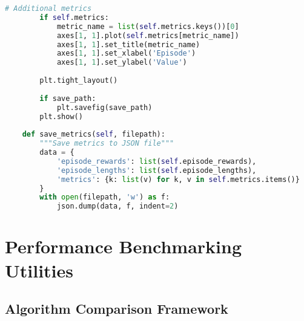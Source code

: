 \begin{lstlisting}[language=Python, caption=Training Logger]
        # Additional metrics
        if self.metrics:
            metric_name = list(self.metrics.keys())[0]
            axes[1, 1].plot(self.metrics[metric_name])
            axes[1, 1].set_title(metric_name)
            axes[1, 1].set_xlabel('Episode')
            axes[1, 1].set_ylabel('Value')
        
        plt.tight_layout()
        
        if save_path:
            plt.savefig(save_path)
        plt.show()
    
    def save_metrics(self, filepath):
        """Save metrics to JSON file"""
        data = {
            'episode_rewards': list(self.episode_rewards),
            'episode_lengths': list(self.episode_lengths),
            'metrics': {k: list(v) for k, v in self.metrics.items()}
        }
        with open(filepath, 'w') as f:
            json.dump(data, f, indent=2)
\end{lstlisting}

\section{Performance Benchmarking Utilities}

\subsection{Algorithm Comparison Framework}

